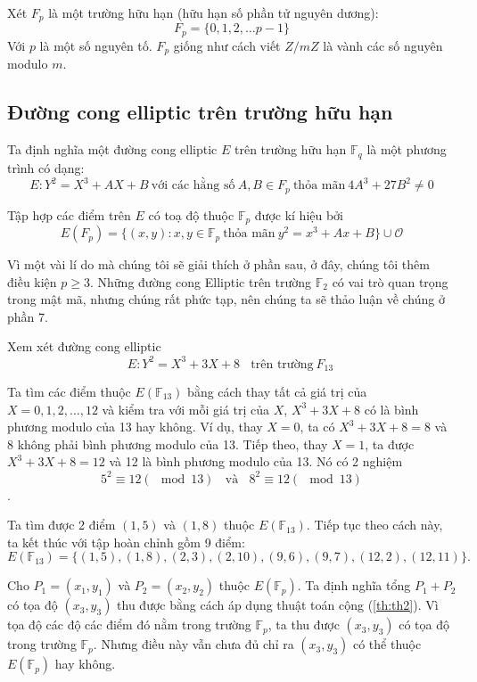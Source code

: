 Xét $F_p$ là một trường hữu hạn (hữu hạn số phần tử nguyên dương):
$$F_p = \{0, 1, 2, \ldots p-1\}$$
Với $p$ là một số nguyên tố. $F_p$ giống như cách viết $Z/mZ$ là vành các số nguyên modulo $m$.
\subsection{Đường cong elliptic trên trường hữu hạn}

Ta định nghĩa một đường cong elliptic $E$ trên trường hữu hạn $\mathbb{F}_q$ là một phương trình có dạng:
$$E: Y^2 = X^3 + AX + B\ \text{với các hằng số}\ A, B \in F_p\ \text{thỏa mãn}\ 4A^3 + 27B^2 \neq 0$$


Tập hợp các điểm trên $E$ có toạ độ thuộc $\mathbb{F} _p$ được kí hiệu bởi
$$E(F_p) = \{(x, y) : x, y \in \mathbb{F}_p\ \text{thỏa mãn}\ y^2 = x^3 + A x + B\} \cup \mathcal{O}$$

\begin{remark}
	Vì một vài lí do mà chúng tôi sẽ giải thích ở phần sau, ở đây, chúng tôi thêm điều kiện $p \geq 3$.
	Những đường cong Elliptic trên trường $\mathbb{F}_2$ có vai trò quan trọng trong mật mã, nhưng chúng rất phức tạp, nên chúng ta sẽ thảo luận về chúng ở phần 7.
\end{remark}

\begin{example}
	\label{ex:ex4}
	Xem xét đường cong elliptic
	$$E: Y^2 = X^3 + 3X + 8 \ \ \ \ \text{trên trường}\  F_{13}\ $$
\end{example}

Ta tìm các điểm thuộc $E(\mathbb{F}_{13})$ bằng cách thay tất cả giá trị của $X = 0,1,2,\ldots,12$ và kiểm tra với mỗi giá trị của $X$, $X^3 + 3X + 8$ có là bình phương modulo của 13 hay không.
Ví dụ, thay $X = 0$, ta có $X^3+3X+8 = 8$ và 8 không phải bình phương modulo của 13.
Tiếp theo, thay $X = 1$, ta được $X^3+3X+8 = 12$ và 12 là bình phương modulo của 13. Nó có 2 nghiệm
$$5^2 \equiv 12 (\mod{13}) \ \ \ \ \text{và} \ \ \ \ 8^2 \equiv 12 (\mod 13)$$.

Ta tìm được 2 điểm $(1,5)$ và $(1,8)$ thuộc $E(\mathbb{F}_{13})$. Tiếp tục theo cách này, ta kết thúc với tập hoàn chỉnh gồm 9 điểm:
$$E(\mathbb{F}_{13}) = \{(1,5), (1,8), (2,3), (2,10), (9,6), (9,7), (12,2), (12,11)\}.$$

Cho $P_1 = (x_1, y_1)$ và $P_2 = (x_2, y_2)$ thuộc $E(\mathbb{F}_{p})$. Ta định nghĩa tổng $P_1+P_2$ có tọa độ $(x_3, y_3)$ thu được bằng cách áp dụng thuật toán cộng (\ref{th:th2}).
Vì tọa độ các độ các điểm đó nằm trong trường $\mathbb{F}_p$, ta thu được $(x_3, y_3)$ có tọa độ trong trường $\mathbb{F}_p$. Nhưng điều này vẫn chưa đủ chỉ ra
$(x_3, y_3)$ có thể thuộc $E(\mathbb{F}_{p})$ hay không.

